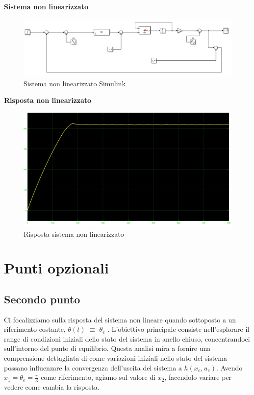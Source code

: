 \documentclass[a4paper, 11pt]{article}
\begin{document}
\textbf{Sistema non linearizzato}
\begin{figure} [!h]
    \centering
    \includegraphics[scale = 0.5]{Simulink/Sim_non_lin_disturbi.png}
    \caption{Sistema non linearizzato Simulink}
    \label{fig:enter-label}
\end{figure}

\vspace{0.3cm}

\textbf{Risposta non linearizzato}

\begin{figure} [!h]
    \centering
    \includegraphics[scale = 0.22]{Step_nonLineare/Step1_noLin.jpg}
    \caption{Risposta sistema non linearizzato}
    \label{fig:enter-label}
\end{figure}



\section{Punti opzionali}

\subsection{Secondo punto}

Ci focalizziamo sulla risposta del sistema non lineare quando sottoposto a un riferimento costante, $\theta(t)$ $\equiv$ $\theta_e$ . L'obiettivo principale consiste nell'esplorare il range di condizioni iniziali dello stato del sistema in anello chiuso, concentrandoci sull'intorno del punto di equilibrio. Questa analisi mira a fornire una comprensione dettagliata di come variazioni iniziali nello stato del sistema possano influenzare la convergenza dell'uscita del sistema a $h(x_e, u_e)$. Avendo $x_1 = \theta_e = \frac{\pi}{3}$ come riferimento, agiamo sul valore di $x_2$, facendolo variare per vedere come cambia la risposta.
\end{document}
